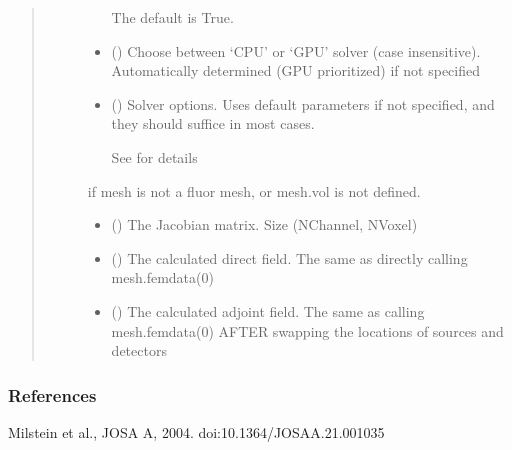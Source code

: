 \documentclass[letterpaper,10pt,english]{sphinxmanual}
\begin{document}
\begin{fulllineitems}
\begin{quote}
\begin{description}
\begin{itemize}
\sphinxAtStartPar
The default is True.


\item {} 
\sphinxAtStartPar
{} (\sphinxstyleliteralemphasis{\sphinxupquote{, }}) \textendash{} Choose between ‘CPU’ or ‘GPU’ solver (case insensitive). Automatically determined (GPU prioritized) if not specified

\item {} 
\sphinxAtStartPar
{} ({\hyperref[\detokenize{_autosummary/nirfasterff.utils.SolverOptions:nirfasterff.utils.SolverOptions}]{}}\sphinxstyleliteralemphasis{\sphinxupquote{, }}) \textendash{} 
\sphinxAtStartPar
Solver options. Uses default parameters if not specified, and they should suffice in most cases.

\sphinxAtStartPar
See {\hyperref[\detokenize{_autosummary/nirfasterff.utils.SolverOptions:nirfasterff.utils.SolverOptions}]{}} for details


\end{itemize}

\sphinxAtStartPar
{} \textendash{} if mesh is not a fluor mesh, or mesh.vol is not defined.

\sphinxAtStartPar
\begin{itemize}
\item {} 
\sphinxAtStartPar
{} () \textendash{} The Jacobian matrix. Size (NChannel, NVoxel)

\item {} 
\sphinxAtStartPar
{} () \textendash{} The calculated direct field. The same as directly calling mesh.femdata(0)

\item {} 
\sphinxAtStartPar
{} () \textendash{} The calculated adjoint field. The same as calling mesh.femdata(0) AFTER swapping the locations of sources and detectors

\end{itemize}


\end{description}\end{quote}
\subsubsection*{References}

\sphinxAtStartPar
Milstein et al., JOSA A, 2004. doi:10.1364/JOSAA.21.001035

\end{fulllineitems}
\end{document}
